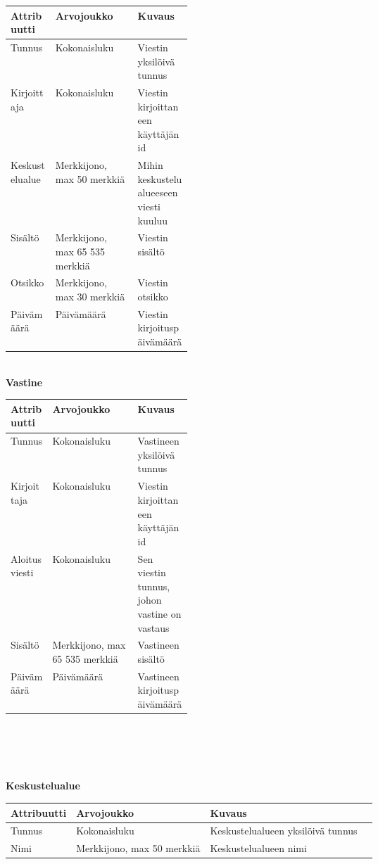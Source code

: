 \documentclass[12pt,a4paper,leqno]{report}
\begin{document}
\begin{center}
\begin{tabular}{| l | l |m{0.3\linewidth}|}
\hline
\textbf{Attribuutti} & \textbf{Arvojoukko} & \textbf{Kuvaus} \\ \hline
Tunnus & Kokonaisluku & Viestin yksilöivä tunnus \\ \hline
Kirjoittaja & Kokonaisluku & Viestin kirjoittaneen käyttäjän id \\ \hline
Keskustelualue & Merkkijono, max 50 merkkiä & Mihin keskustelualueeseen viesti kuuluu \\ \hline
Sisältö & Merkkijono, max 65 535 merkkiä & Viestin sisältö \\ \hline
Otsikko & Merkkijono, max 30 merkkiä & Viestin otsikko \\ \hline
Päivämäärä & Päivämäärä & Viestin kirjoituspäivämäärä \\ \hline
\end{tabular}
\end{center}
\ \\

\noindent \textbf{Vastine}

\begin{center}
\begin{tabular}{| l | l |m{0.3\linewidth}|}
\hline
\textbf{Attribuutti} & \textbf{Arvojoukko} & \textbf{Kuvaus} \\ \hline
Tunnus & Kokonaisluku & Vastineen yksilöivä tunnus \\ \hline
Kirjoittaja & Kokonaisluku & Viestin kirjoittaneen käyttäjän id \\ \hline
Aloitusviesti & Kokonaisluku & Sen viestin tunnus, johon vastine on vastaus \\ \hline
Sisältö & Merkkijono, max 65 535 merkkiä & Vastineen sisältö \\ \hline
Päivämäärä & Päivämäärä & Vastineen kirjoituspäivämäärä \\ \hline
\end{tabular}
\end{center}
\ \\ \\ \\ \\

\noindent \textbf{Keskustelualue}

\begin{center}
\begin{tabular}{| l | l | l | l |}
\hline
\textbf{Attribuutti} & \textbf{Arvojoukko} & \textbf{Kuvaus} \\ \hline
Tunnus & Kokonaisluku & Keskustelualueen yksilöivä tunnus \\ \hline
Nimi & Merkkijono, max 50 merkkiä & Keskustelualueen nimi \\ \hline
\end{tabular}
\end{center}
\end{document}
